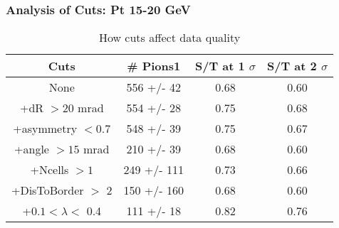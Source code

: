\frame
{
\frametitle{Analysis of Cuts: Pt 15-20 GeV}
\begin{table}
\caption{How cuts affect data quality}
\centering
\begin{tabular}{c c c c}
\hline\hline
Cuts & \# Pions1 & S/T at 1 $\sigma$ & S/T at 2 $\sigma$ \\ [0.5ex]
\hline
None &  556 +/-   42 & 0.68 & 0.60 \\ %
+dR $> 20$ mrad &  554 +/-   28 & 0.75 & 0.68 \\ %
+asymmetry $< 0.7$ &  548 +/-   39 & 0.75 & 0.67 \\ %
+angle $> 15$ mrad &  210 +/-   39 & 0.68 & 0.60 \\ %
+Ncells $> 1$&  249 +/-  111 & 0.73 & 0.66 \\ %
+DisToBorder $>$ 2 &  150 +/-  160 & 0.68 & 0.60 \\ %
+$0.1 < \lambda <$ 0.4 &  111 +/-   18 & 0.82 & 0.76 \\ %
[1ex]
\hline
\end{tabular}
\label{table:nonlin}
\end{table}
}
